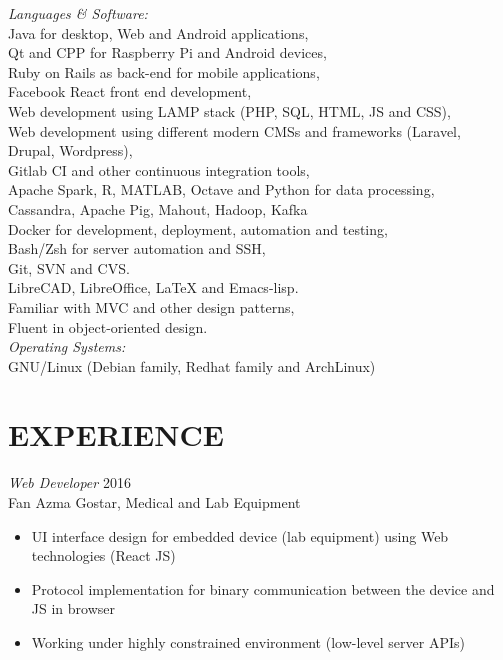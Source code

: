 \documentclass[margin, 10pt]{res} %
\begin{document}
\begin{resume}
{\sl Languages \& Software:} \\
Java for desktop, Web and Android applications, \\
Qt and CPP for Raspberry Pi and Android devices, \\
Ruby on Rails as back-end for mobile applications, \\
Facebook React front end development, \\
Web development using LAMP stack (PHP, SQL, HTML, JS and CSS), \\
Web development using different modern CMSs and frameworks (Laravel, Drupal, Wordpress), \\
Gitlab CI and other continuous integration tools, \\
Apache Spark, R, MATLAB, Octave and Python for data processing, \\
Cassandra, Apache Pig, Mahout, Hadoop, Kafka \\
Docker for development, deployment, automation and testing, \\
Bash/Zsh for server automation and SSH, \\
Git, SVN and CVS. \\
LibreCAD, LibreOffice, LaTeX and Emacs-lisp. \\
Familiar with MVC and other design patterns, \\
Fluent in object-oriented design. \\
{\sl Operating Systems:} \\
GNU/Linux (Debian family, Redhat family and ArchLinux)
 
 
\section{EXPERIENCE}

{\sl Web Developer} \hfill 2016 \\
Fan Azma Gostar, Medical and Lab Equipment \\

\begin{itemize} \itemsep -2pt %
\item UI interface design for embedded device (lab equipment) using Web
  technologies (React JS)
\item Protocol implementation for binary communication between the device and JS
  in browser
\item Working under highly constrained environment (low-level server APIs)
\end{itemize}


\end{resume}
\end{document}
